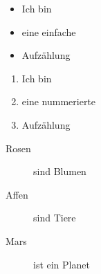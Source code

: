 \documentclass[12pt,ngerman]{scrartcl}
\begin{document}
\begin{itemize}
	\item Ich bin
	\item eine einfache
	\item Aufzählung
\end{itemize}

\begin{enumerate}
	\item Ich bin
	\item eine nummerierte
	\item Aufzählung
\end{enumerate}

\begin{description}
\item[Rosen] sind Blumen
\item[Affen] sind Tiere
\item[Mars] ist ein Planet
\end{description}
\end{document}
